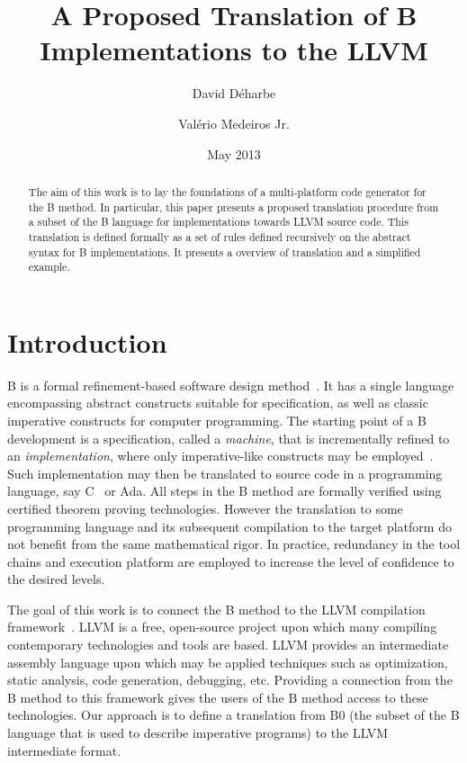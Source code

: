 \documentclass{llncs}
\title{A Proposed Translation of B Implementations to the LLVM}
\author{David D\'{e}harbe \inst{1} \and Val\'{e}rio Medeiros Jr.\inst{2}}
\institute{Federal University of Rio Grande do Norte, UFRN, Brazil\\
\and 
Federal Institute of Education, Science and Technology  of Rio Grande do Norte, IFRN, Brazil}
\date{May 2013}
\begin{document}
\maketitle

\begin{abstract}
The aim of this work is to lay the foundations of a multi-platform code
generator for the B method. In particular, this paper presents a proposed
translation  procedure from a subset of the B language for implementations
towards LLVM source code. This translation is defined formally as a set of
rules defined recursively on the abstract syntax for B implementations. It 
presents a overview of translation and a simplified example.
\end{abstract}

\section{Introduction}

B is a formal refinement-based software design method~\cite{Abrial1996}. It has
a single language encompassing abstract constructs suitable for specification,
as well as classic imperative constructs for computer programming. The starting
point of a B development is a specification, called a \emph{machine}, that is
incrementally refined to an \emph{implementation}, where only imperative-like
constructs may be employed~\cite{Clearsy}. Such implementation may then be
translated to source code in a programming language, say C~\cite{ComenC} or
Ada. All steps in the B method are formally verified using certified theorem
proving technologies. However the translation to some programming language and
its subsequent compilation to the target platform do not benefit from the same
mathematical rigor. In practice, redundancy in the tool chains and execution
platform are employed to increase the level of confidence to the desired levels.

The goal of this work is to connect the B method to the LLVM compilation
framework~\cite{Lattner04LLVM}.  LLVM is a free, open-source project upon which
many compiling contemporary technologies and tools are based. LLVM provides an
intermediate assembly language upon which may be applied techniques such as
optimization, static analysis, code generation, debugging, etc. Providing a
connection from the B method to this framework gives the users of the B method
access to these technologies. Our approach is to define a translation from B0
(the subset of the B language that is used to describe imperative programs) to
the LLVM intermediate format.
\end{document}

